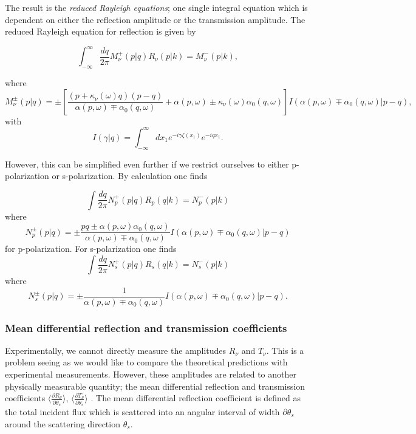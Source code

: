 \documentclass[../main.tex]{subfiles}
\begin{document}
The result is the \textit{reduced Rayleigh equations}; one single integral equation which is dependent on either the reflection amplitude or the transmission amplitude. The reduced Rayleigh equation for reflection is given by \cite{Simonsen2010}

\begin{equation} \label{eq:RRE}
    \int_{-\infty}^\infty \frac{dq}{2\pi}M_{\nu}^{+}(p|q)R_{\nu}(p|k) = M_{\nu}^{-}(p|k),
\end{equation}

where 
\begin{equation} \label{eq:M}
    M_{\nu}^{\pm}(p|q) = \pm \left[ \frac{(p + \kappa_{\nu}(\omega)q)(p-q)}{\alpha(p,\omega)\mp\alpha_0(q,\omega)} + \alpha(p,\omega) \pm \kappa_{\nu}(\omega)\alpha_0(q,\omega)\right] I(\alpha(p,\omega) \mp \alpha_0(q,\omega)|p-q),
\end{equation}
with 
\begin{equation} \label{I_integral}
    I(\gamma|q) = \int_{-\infty}^\infty dx_1 e^{-i\gamma\zeta(x_1)}e^{-iqx_1}.
\end{equation}

However, this can be simplified even further if we restrict ourselves to either p-polarization or s-polarization. By calculation one finds 

\begin{equation} \label{rayleighred_p_pol}
\int\frac{dq}{2\pi}N_p^+(p|q)R_p(q|k) = N_p^-(p|k)
\end{equation}
where 
\begin{equation}
    N_p^{\pm}(p|q) = \pm \frac{pq \pm \alpha(p,\omega)\alpha_0(q,\omega)}{\alpha(p,\omega)\mp \alpha_0(q,\omega)}I(\alpha(p,\omega) \mp \alpha_0(q,\omega)|p-q)
\end{equation}
for p-polarization. For s-polarization one finds
\begin{equation}\label{rayleighred_s_pol}
    \int\frac{dq}{2\pi}N_s^+(p|q)R_s(q|k) = N_s^-(p|k)
\end{equation}
where
\begin{equation}
    N_s^{\pm}(p|q) = \pm \frac{1}{\alpha(p,\omega)\mp \alpha_0(q,\omega)}I(\alpha(p,\omega) \mp \alpha_0(q,\omega)|p-q).
\end{equation}

\subsubsection{Mean differential reflection and transmission coefficients}
Experimentally, we cannot directly measure the amplitudes $R_\nu$ and $T_\nu$. This is a problem seeing as we would like to compare the theoretical predictions with experimental measurements. However, these amplitudes are related to another physically measurable quantity; the mean differential reflection and transmission coefficients  $\langle \frac{\partial R_\nu}{\partial \theta_s} \rangle$, $\langle \frac{\partial T_\nu}{\partial \theta_s} \rangle$ \cite{MARADUDIN1990,Simonsen2010}. The mean differential reflection coefficient is defined as the total incident flux which is scattered into an angular interval of width $\partial \theta_s$ around the scattering direction $\theta_s$.
\end{document}
